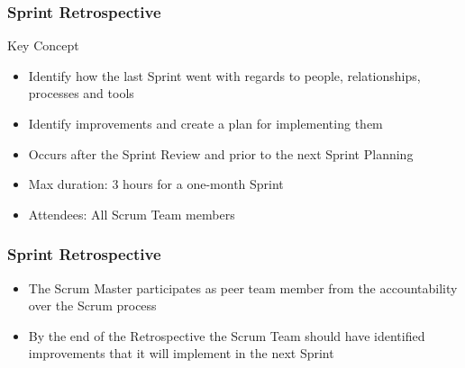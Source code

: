 \begin{frame}
	\frametitle{Sprint Retrospective}
	\begin{block}{Key Concept}
		\begin{itemize}
			\item Identify how the last Sprint went with regards to people, relationships, processes and tools
			\item Identify improvements and create a plan for implementing them
		\end{itemize}
	\end{block}
	\vspace{0.5em}
	\begin{itemize}
		\setlength\itemsep{0.7em}
		\item Occurs after the Sprint Review and prior to the next Sprint Planning
		\item Max duration: 3 hours for a one-month Sprint
		\item Attendees: All Scrum Team members
	\end{itemize}
\end{frame}

\begin{frame}
	\frametitle{Sprint Retrospective}
	\begin{itemize}
		\setlength\itemsep{0.7em}
		\item The Scrum Master participates as peer team member from the accountability over the Scrum process
		\item By the end of the Retrospective the Scrum Team should have identified improvements that it will implement in the next Sprint
	\end{itemize}
\end{frame}